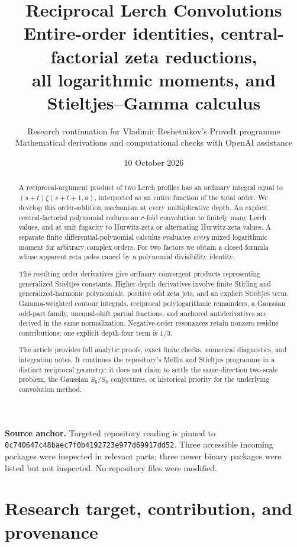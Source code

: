 \documentclass[11pt,a4paper]{article}
\title{\textbf{Reciprocal Lerch Convolutions}\\[6pt]
\large Entire-order identities, central-factorial zeta reductions,\\
all logarithmic moments, and Stieltjes--Gamma calculus}
\author{Research continuation for Vladimir Reshetnikov's ProveIt programme\\
\small Mathematical derivations and computational checks with OpenAI assistance}
\date{10 October 2026}
\numberwithin{equation}{section}
\theoremstyle{definition}\newtheorem{definition}[theorem]{Definition}
\theoremstyle{remark}\newtheorem{remark}[theorem]{Remark}
\newcommand{\src}[1]{\nolinkurl{#1}}
\newcommand{\pin}{\src{0c740647c48baec7f0b4192723e977d69917dd52}}
\begin{document}
\maketitle
\begin{abstract}
A reciprocal-argument product of two Lerch profiles has an ordinary
integral equal to $(s+t)\zeta(s+t+1,a)$, interpreted as an entire function
of the total order. We develop this order-addition mechanism at every
multiplicative depth. An explicit central-factorial polynomial reduces
an $r$-fold convolution to finitely many Lerch values, and at unit
fugacity to Hurwitz-zeta or alternating Hurwitz-zeta values. A separate
finite differential-polynomial calculus evaluates \emph{every} mixed
logarithmic moment for arbitrary complex orders. For two factors we
obtain a closed formula whose apparent zeta poles cancel by a polynomial
divisibility identity.

The resulting order derivatives give ordinary convergent products
representing generalized Stieltjes constants. Higher-depth derivatives
involve finite Stirling and generalized-harmonic polynomials, positive
odd zeta jets, and an explicit Stieltjes term. Gamma-weighted contour
integrals, reciprocal polylogarithmic remainders, a Gaussian odd-part
family, unequal-shift partial fractions, and anchored antiderivatives
are derived in the same normalization. Negative-order resonances retain
nonzero residue contributions; one explicit depth-four term is $1/3$.

The article provides full analytic proofs, exact finite checks, numerical
diagnostics, and integration notes. It continues the repository's
Mellin and Stieltjes programme in a distinct reciprocal geometry; it
does not claim to settle the same-direction two-scale problem, the
Gaussian $S_6/S_8$ conjectures, or historical priority for the underlying
convolution method.
\end{abstract}
\vfill
\noindent\small\textbf{Source anchor.} Targeted repository reading is pinned to\\
\pin. Three accessible incoming packages were inspected in relevant
parts; three newer binary packages were listed but not inspected.
No repository files were modified.\normalsize
\clearpage
\begingroup
\small
\tableofcontents
\endgroup
\clearpage

\section{Research target, contribution, and provenance}
\label{rlc:sec:scope}
\end{document}
